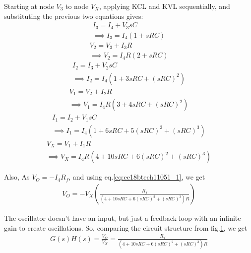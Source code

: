 \begin{enumerate}[label=\arabic*.,ref=\theenumi]
Starting at node $V_{3}$ to node $V_{X}$, applying KCL and KVL sequentially, and substituting the previous two equations gives:\\
\begin{multline}
    I_{3} = I_{4} + V_{3}sC  \\  \implies I_{3} = I_{4}(1+sRC) 
\end{multline}
\begin{multline}
    V_{2} = V_{3} + I_{3}R  \\  \implies V_{2} = I_{4}R(2+sRC)
\end{multline}
\begin{multline}
    I_{2} = I_{3} + V_{2}sC\\
    \implies I_{2} = I_{4}(1+3sRC+(sRC)^{2}) 
\end{multline}
\begin{multline}
    V_{1} = V_{2}+ I_{2}R\\
    \implies V_{1} = I_{4}R(3+4sRC+(sRC)^{2})
\end{multline}
\begin{multline}
    I_{1} = I_{2} + V_{1}sC\\
    \implies I_{1} = I_{4}(1+6sRC+5(sRC)^2+(sRC)^3)
\end{multline}
\begin{multline}
    V_{X} = V_{1} + I_{1}R\\
    \implies V_{X} = I_{4}R(4+10sRC+6(sRC)^2+(sRC)^3)
    \label{eq:ee18btech11051_1}
\end{multline}

\begin{figure}[!ht]
	\begin{center}
		\resizebox{\columnwidth}{!}{}
	\end{center}
\caption{}
\label{fig:ee18btech11051_fig3}
\end{figure}
Also, As $V_{O} = -I_{4}R_{f}$, and using eq.\ref{eq:ee18btech11051_1}, we get
\begin{align}
    V_{O} = -V_{X}(\frac{R_{f}}{(4+10sRC+6(sRC)^2+(sRC)^3)R})
\end{align}

The oscillator doesn't have an input, but just a feedback loop with an infinite gain to create oscillations. So, comparing the circuit structure from fig.\ref{fig:ee18btech11051_fig3}, we get
\begin{align}
    G(s)H(s) = \frac{V_{O}}{V_{X}} = \frac{R_{f}}{(4+10sRC+6(sRC)^2+(sRC)^3)R}\label{eq:ee18btech11051_2}
\end{align}


\end{enumerate}
